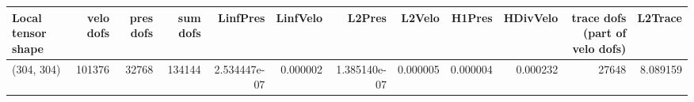 \begin{tabular}{lrrrrrrrrrrr}
\toprule
Local tensor shape &  velo dofs &  pres dofs &  sum dofs &     LinfPres &  LinfVelo &       L2Pres &   L2Velo &   H1Pres &  HDivVelo &  trace dofs (part of velo dofs) &  L2Trace \\
\midrule
        (304, 304) &     101376 &      32768 &    134144 & 2.534447e-07 &  0.000002 & 1.385140e-07 & 0.000005 & 0.000004 &  0.000232 &                           27648 & 8.089159 \\
\bottomrule
\end{tabular}
